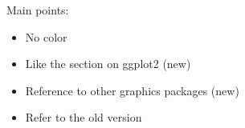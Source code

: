 \documentclass{article}
\begin{document}
Main points:

\begin{itemize}
\item No color
\item Like the section on ggplot2 (new)
\item Reference to other graphics packages (new)
\item Refer to the old version
\end{itemize}
\end{document}
